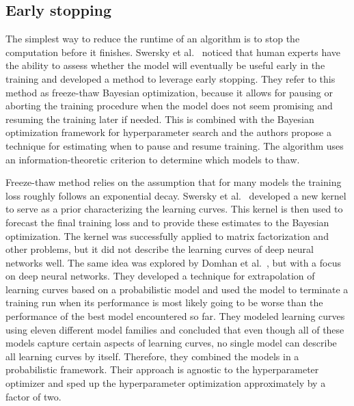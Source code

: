 \subsection{Early stopping}
The simplest way to reduce the runtime of an algorithm is to stop the computation before it finishes. Swersky et al.~\cite{swersky2014freeze} noticed that human experts have the ability to assess whether the model will eventually be useful early in the training and developed a method to leverage early stopping. They refer to this method as freeze-thaw Bayesian optimization, because it allows for pausing or aborting the training procedure when the model does not seem promising and resuming the training later if needed. This is combined with the Bayesian optimization framework for hyperparameter search and the authors propose a technique for estimating when to pause and resume training. The algorithm uses an information-theoretic criterion to determine which models to thaw.

Freeze-thaw method relies on the assumption that for many models the training loss roughly follows an exponential decay. Swersky et al.~\cite{swersky2014freeze} developed a new kernel to serve as a prior characterizing the learning curves. This kernel is then used to forecast the final training loss and to provide these estimates to the Bayesian optimization. The kernel was successfully applied to matrix factorization and other problems, but it did not describe the learning curves of deep neural networks well. The same idea was explored by Domhan et al.~\cite{domhan2015speeding}, but with a focus on deep neural networks. They developed a technique for extrapolation of learning curves based on a probabilistic model and used the model to terminate a training run when its performance is most likely going to be worse than the performance of the best model encountered so far. They modeled learning curves using eleven different model families and concluded that even though all of these models capture certain aspects of learning curves, no single model can describe all learning curves by itself. Therefore, they combined the models in a probabilistic framework. Their approach is agnostic to the hyperparameter optimizer and sped up the hyperparameter optimization approximately by a factor of two.

